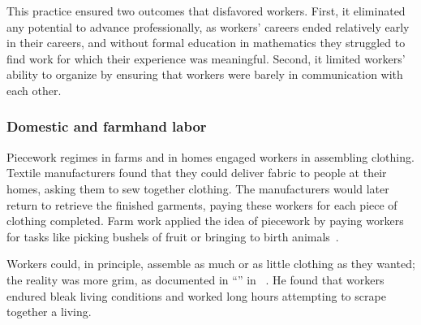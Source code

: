 \documentclass[trackingWork]{subfiles}
\begin{document}
This practice ensured two outcomes that disfavored workers.
First, it eliminated any potential to advance professionally, as
workers' careers ended relatively early in their careers,
and without formal education in mathematics they struggled to find work for which their experience was meaningful.
Second, it limited workers' ability to organize
by ensuring that workers were barely in communication with each other.



\subsubsection{Domestic and farmhand labor}

\begin{comment}
What did I pull from the threads that are related to domestic/farmwork?

- Graves: sparks of Scientific Management in Piecework, especially starting here
- 19th century: piecework was mostly cottage industry with untrained or informally trained workers
  (unlike industrial metal workers during WWII)
- Brown: Task variability matters
- Clark: pieceworkers work harder, more diligently, etc...
- Riis saw terrible conditions, documented and communicated it to the world

\citeauthor{clark1908cotton} observed textile mill pieceworkers and reported,
``When he works by the day the Italian operative wishes to leave before the whistle blows,
but if he works by the piece he will work as many hours as it is possible for him to stand''~\cite{clark1908cotton}.


\end{comment}

Piecework regimes in farms and in homes engaged workers in assembling clothing. %
Textile manufacturers found that they could deliver fabric to people at their homes, asking them to sew together clothing.
The manufacturers would later return to retrieve the finished garments,
paying these workers for each piece of clothing completed. 
Farm work applied the idea of piecework by
paying workers for tasks like picking bushels of fruit or bringing to birth animals~\cite{10.2307/2338394}.

Workers could, in principle, assemble as much or as little clothing as they wanted;
the reality was more grim, as
\citeauthor{riisOtherSideLives} documented in ``'' in \citeyear{riisOtherSideLives}~\cite{riisOtherSideLives}.
He found that
workers endured bleak living conditions and
worked long hours attempting to scrape together a living.
\end{document}
